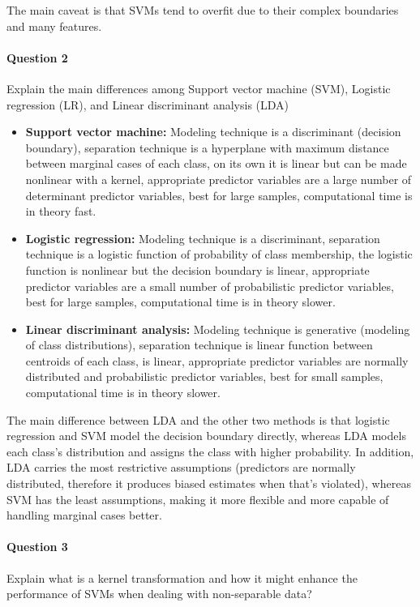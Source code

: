 \documentclass[journal]{IEEEtran}
\begin{document}
The main caveat is that SVMs tend to overfit due to their complex boundaries and many features.
\\


\paragraph{Question 2} Explain the main differences among Support vector machine (SVM), Logistic regression (LR), and Linear discriminant analysis (LDA)

\begin{itemize}
    \item \textbf{Support vector machine:} Modeling technique is a discriminant (decision boundary), separation technique is a hyperplane with maximum distance between marginal cases of each class, on its own it is linear but can be made nonlinear with a kernel, appropriate predictor variables are a large number of determinant predictor variables, best for large samples, computational time is in theory fast.
    \item \textbf{Logistic regression:} Modeling technique is a discriminant, separation technique is a logistic function of probability of class membership, the logistic function is nonlinear but the decision boundary is linear, appropriate predictor variables are a small number of probabilistic predictor variables, best for large samples, computational time is in theory slower.
    \item \textbf{Linear discriminant analysis:} Modeling technique is generative (modeling of class distributions), separation technique is linear function between centroids of each class, is linear, appropriate predictor variables are normally distributed and probabilistic predictor variables, best for small samples, computational time is in theory slower.
\end{itemize}

The main difference between LDA and the other two methods is that logistic regression and SVM model the decision boundary directly, whereas LDA models each class's distribution and assigns the class with higher probability. In addition, LDA carries the most restrictive assumptions (predictors are normally distributed, therefore it produces biased estimates when that's violated), whereas SVM has the least assumptions, making it more flexible and more capable of handling marginal cases better.
\\

\paragraph{Question 3} Explain what is a kernel transformation and how it might enhance the performance of SVMs when dealing with non-separable data?
\end{document}
